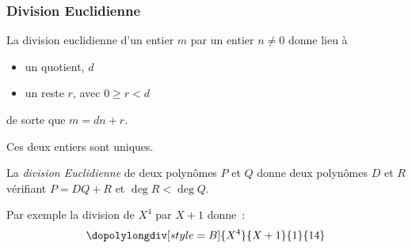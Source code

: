 \subsubsection{Division Euclidienne}
\begin{frame}
  \begin{remark}
    La division \og euclidienne\fg{} d'un entier \(m\) par un entier \(n\neq 0\) donne lieu à
    \begin{itemize}\pause{}
    \item un quotient, \(d\)\pause{}
    \item un reste \(r\), avec \(0 \geq r < d\)
    \end{itemize}
    de sorte que \(m = dn + r\).\pause{}

    Ces deux entiers sont uniques.
  \end{remark}\pause{}

  \begin{definition}
    La \emph{division Euclidienne} de deux polynômes \(P\) et \(Q\)\pause{} donne deux polynômes \(D\) et \(R\) vérifiant \(P = DQ + R\) et \(\deg R < \deg Q\).
  \end{definition}\pause{}
\end{frame}

\begin{frame}
  \begin{example}Par exemple la division de \(X^{4}\) par \(X+1\) donne~:\pause{}
    \begin{equation*}
      \dopolylongdiv[style=B]{X^4}{X+1}{1}{14}
    \end{equation*}
  \end{example}
\end{frame}

